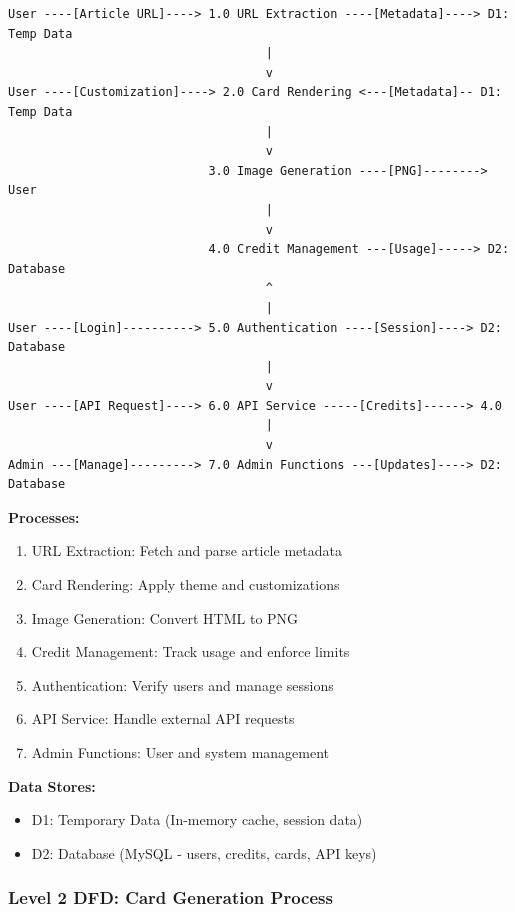 \documentclass[12pt,a4paper]{article}
\begin{document}
\begin{verbatim}
User ----[Article URL]----> 1.0 URL Extraction ----[Metadata]----> D1: Temp Data
                                    |
                                    v
User ----[Customization]----> 2.0 Card Rendering <---[Metadata]-- D1: Temp Data
                                    |
                                    v
                            3.0 Image Generation ----[PNG]--------> User
                                    |
                                    v
                            4.0 Credit Management ---[Usage]-----> D2: Database
                                    ^
                                    |
User ----[Login]----------> 5.0 Authentication ----[Session]----> D2: Database
                                    |
                                    v
User ----[API Request]----> 6.0 API Service -----[Credits]------> 4.0
                                    |
                                    v
Admin ---[Manage]---------> 7.0 Admin Functions ---[Updates]----> D2: Database
\end{verbatim}

\textbf{Processes:}
\begin{enumerate}
    \item URL Extraction: Fetch and parse article metadata
    \item Card Rendering: Apply theme and customizations
    \item Image Generation: Convert HTML to PNG
    \item Credit Management: Track usage and enforce limits
    \item Authentication: Verify users and manage sessions
    \item API Service: Handle external API requests
    \item Admin Functions: User and system management
\end{enumerate}

\textbf{Data Stores:}
\begin{itemize}
    \item D1: Temporary Data (In-memory cache, session data)
    \item D2: Database (MySQL - users, credits, cards, API keys)
\end{itemize}

\subsubsection{Level 2 DFD: Card Generation Process}
\end{document}
